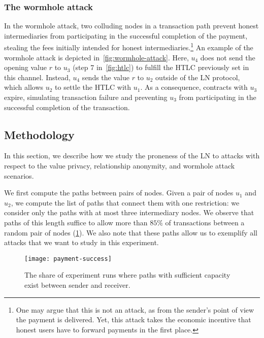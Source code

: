 \subsubsection{The wormhole attack}
In the wormhole attack, two colluding nodes in a transaction path prevent honest intermediaries from 
participating in the successful completion of the payment, stealing the 
fees initially intended for honest intermediaries.\footnote{One may argue that this is not an attack, as from the sender's point of view the payment is delivered. Yet, this attack takes the economic incentive that honest users have to forward payments in the first place.} 
An example of the wormhole attack is depicted in~\cref{fig:wormhole-attack}. 
Here, $u_4$ does not send the opening value $r$ to $u_3$ (step 7 in~\cref{fig:htlc}) to fulfill the HTLC previously set in this channel. 
Instead, $u_4$ sends the value $r$ to $u_2$ outside of the LN protocol, which allows $u_2$ to settle the HTLC with $u_1$. 
As a consequence, contracts with $u_3$ expire, simulating transaction failure and
preventing $u_3$ from participating in the successful completion of the transaction. 



\subsection{Methodology}
In this section, we describe how we study the proneness of the LN to attacks with respect to the value privacy, relationship anonymity, and wormhole attack scenarios. 

We first compute the paths between pairs of nodes.
Given a pair of nodes $u_1$ and $u_2$, 
we compute the list of paths that connect them with one restriction:
we consider only the paths with at most three intermediary nodes.
We observe that paths of this length suffice to allow more than $85\%$ of 
transactions between a random pair of nodes (\cref{fig:payment-success}).
We also note that these paths allow us to exemplify all attacks that we want to study in this experiment.
\begin{figure}
	\centering
	\texttt{[image: payment-success]}
	\caption{The share of experiment runs where paths with sufficient capacity exist between sender and receiver.}
	\label{fig:payment-success}
\end{figure}

